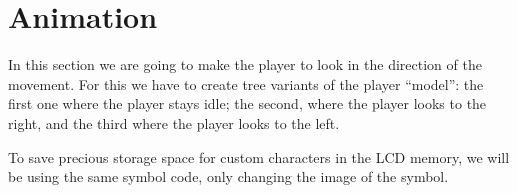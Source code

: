 \documentclass[../sparc.tex]{subfiles}
\begin{document}
\section{Animation}

In this section we are going to make the player to look in the direction of the
movement.  For this we have to create tree variants of the player ``model'': the
first one where the player stays idle; the second, where the player looks to the
right, and the third where the player looks to the left.

To save precious storage space for custom characters in the LCD memory, we will
be using the same symbol code, only changing the image of the symbol.
\end{document}
